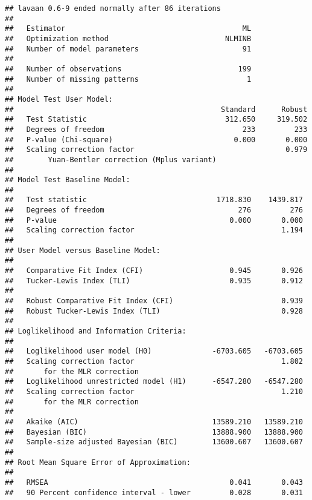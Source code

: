 \documentclass[
  english,
  man]{apa6}
\begin{document}
\begin{verbatim}
## lavaan 0.6-9 ended normally after 86 iterations
## 
##   Estimator                                         ML
##   Optimization method                           NLMINB
##   Number of model parameters                        91
##                                                       
##   Number of observations                           199
##   Number of missing patterns                         1
##                                                       
## Model Test User Model:
##                                                Standard      Robust
##   Test Statistic                                312.650     319.502
##   Degrees of freedom                                233         233
##   P-value (Chi-square)                            0.000       0.000
##   Scaling correction factor                                   0.979
##        Yuan-Bentler correction (Mplus variant)                     
## 
## Model Test Baseline Model:
## 
##   Test statistic                              1718.830    1439.817
##   Degrees of freedom                               276         276
##   P-value                                        0.000       0.000
##   Scaling correction factor                                  1.194
## 
## User Model versus Baseline Model:
## 
##   Comparative Fit Index (CFI)                    0.945       0.926
##   Tucker-Lewis Index (TLI)                       0.935       0.912
##                                                                   
##   Robust Comparative Fit Index (CFI)                         0.939
##   Robust Tucker-Lewis Index (TLI)                            0.928
## 
## Loglikelihood and Information Criteria:
## 
##   Loglikelihood user model (H0)              -6703.605   -6703.605
##   Scaling correction factor                                  1.802
##       for the MLR correction                                      
##   Loglikelihood unrestricted model (H1)      -6547.280   -6547.280
##   Scaling correction factor                                  1.210
##       for the MLR correction                                      
##                                                                   
##   Akaike (AIC)                               13589.210   13589.210
##   Bayesian (BIC)                             13888.900   13888.900
##   Sample-size adjusted Bayesian (BIC)        13600.607   13600.607
## 
## Root Mean Square Error of Approximation:
## 
##   RMSEA                                          0.041       0.043
##   90 Percent confidence interval - lower         0.028       0.031

\end{verbatim}
\end{document}
